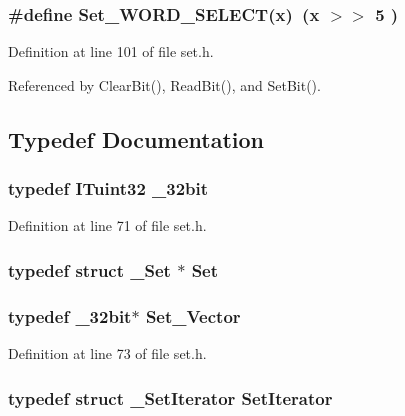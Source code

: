 \subsubsection{\setlength{\rightskip}{0pt plus 5cm}\#define Set\_\-WORD\_\-SELECT(x)~(x $>$$>$ 5 )}\label{set_8h_afd961b9d0f9089a5641d659960c5c36}




Definition at line 101 of file set.h.

Referenced by Clear\-Bit(), Read\-Bit(), and Set\-Bit().

\subsection{Typedef Documentation}
\subsubsection{\setlength{\rightskip}{0pt plus 5cm}typedef \bf{ITuint32} \bf{\_\-32bit}}\label{set_8h_04313f0728ca182ac8a9d301c157d851}




Definition at line 71 of file set.h.
\subsubsection{\setlength{\rightskip}{0pt plus 5cm}typedef struct \bf{\_\-Set} $\ast$ \bf{Set}}\label{set_8h_d15a97507f279d19e98ed9801e6a9f01}


\subsubsection{\setlength{\rightskip}{0pt plus 5cm}typedef \bf{\_\-32bit}$\ast$ \bf{Set\_\-Vector}}\label{set_8h_27404d3ba6709384325e0d12b80a717b}




Definition at line 73 of file set.h.
\subsubsection{\setlength{\rightskip}{0pt plus 5cm}typedef struct \bf{\_\-Set\-Iterator}
 \bf{Set\-Iterator}}\label{set_8h_3c70f3d27a89c2cba0fff62b42a04b93}




